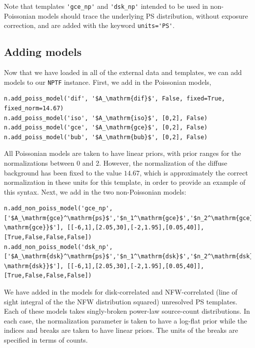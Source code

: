 Note that templates \lstinline{'gce_np'} and \lstinline{'dsk_np'} intended to be used in non-Poissonian models should trace the underlying PS distribution, without exposure correction, and are added with the keyword \lstinline{units='PS'}.

\subsection{Adding models}
Now that we have loaded in all of the external data and templates, we can add models to our \lstinline{NPTF} instance.  First, we add in the Poissonian models,
\begin{lstlisting}
n.add_poiss_model('dif', '$A_\mathrm{dif}$', False, fixed=True, fixed_norm=14.67)
n.add_poiss_model('iso', '$A_\mathrm{iso}$', [0,2], False)
n.add_poiss_model('gce', '$A_\mathrm{gce}$', [0,2], False)
n.add_poiss_model('bub', '$A_\mathrm{bub}$', [0,2], False)
\end{lstlisting}
All Poissonian models are taken to have linear priors, with prior ranges for the normalizations between 0 and 2.  However, the normalization of the diffuse background has been fixed to the value $14.67$, which is approximately the correct normalization in these units for this template, in order to provide an example of this syntax.  Next, we add in the two non-Poissonian models:
\begin{lstlisting}
n.add_non_poiss_model('gce_np', ['$A_\mathrm{gce}^\mathrm{ps}$','$n_1^\mathrm{gce}$','$n_2^\mathrm{gce}$','$S_b^{(1), \mathrm{gce}}$'], [[-6,1],[2.05,30],[-2,1.95],[0.05,40]], [True,False,False,False])
n.add_non_poiss_model('dsk_np', ['$A_\mathrm{dsk}^\mathrm{ps}$','$n_1^\mathrm{dsk}$','$n_2^\mathrm{dsk}$','$S_b^{(1), \mathrm{dsk}}$'], [[-6,1],[2.05,30],[-2,1.95],[0.05,40]], [True,False,False,False])
\end{lstlisting}
We have added in the models for disk-correlated and NFW-correlated (line of sight integral of the the NFW distribution squared) unresolved PS templates.  Each of these models takes singly-broken power-law source-count distributions.  In each case, the normalization parameter is taken to have a log-flat prior while the indices and breaks are taken to have linear priors.  The units of the breaks are specified in terms of counts. 

